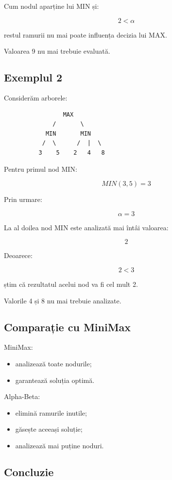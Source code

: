 \documentclass[12pt,a4paper]{article}
\begin{document}
Cum nodul aparține lui MIN și:

\[
2 < \alpha
\]

restul ramurii nu mai poate influența decizia lui MAX.

Valoarea 9 nu mai trebuie evaluată.

\subsection{Exemplul 2}

Considerăm arborele:

\begin{verbatim}
                 MAX
              /       \
            MIN       MIN
           /  \      /  |  \
          3    5    2   4   8
\end{verbatim}

Pentru primul nod MIN:

\[
MIN(3,5)=3
\]

Prin urmare:

\[
\alpha = 3
\]

La al doilea nod MIN este analizată mai întâi valoarea:

\[
2
\]

Deoarece:

\[
2 < 3
\]

știm că rezultatul acelui nod va fi cel mult 2.

Valorile 4 și 8 nu mai trebuie analizate.

\subsection{Comparație cu MiniMax}

MiniMax:

\begin{itemize}
\item analizează toate nodurile;
\item garantează soluția optimă.
\end{itemize}

Alpha-Beta:

\begin{itemize}
\item elimină ramurile inutile;
\item găsește aceeași soluție;
\item analizează mai puține noduri.
\end{itemize}

\subsection{Concluzie}
\end{document}
